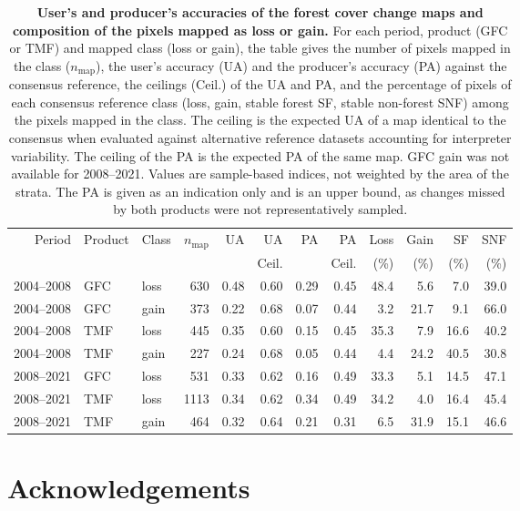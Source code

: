 \documentclass[paper=a4, fontsize=12pt, DIV=13, english, dvipsnames]{scrartcl}
\begin{document}
\begin{table}[htbp]
\caption{\label{tab:orge0d9ad2}\textbf{User's and producer's accuracies of the forest cover change maps and composition of the pixels mapped as loss or gain.} For each period, product (GFC or TMF) and mapped class (loss or gain), the table gives the number of pixels mapped in the class (\(n_{\text{map}}\)), the user's accuracy (UA) and the producer's accuracy (PA) against the consensus reference, the ceilings (Ceil.) of the UA and PA, and the percentage of pixels of each consensus reference class (loss, gain, stable forest SF, stable non-forest SNF) among the pixels mapped in the class. The ceiling is the expected UA of a map identical to the consensus when evaluated against alternative reference datasets accounting for interpreter variability. The ceiling of the PA is the expected PA of the same map. GFC gain was not available for 2008--2021. Values are sample-based indices, not weighted by the area of the strata. The PA is given as an indication only and is an upper bound, as changes missed by both products were not representatively sampled.\label{tab:change-ua}\\
}
\centering
\small
\begin{tabular}{rllrrrrrrrrr}
\toprule
Period & Product & Class & \(n_{\text{map}}\) & UA & UA & PA & PA & Loss & Gain & SF & SNF\\
 &  &  &  &  & Ceil. &  & Ceil. & (\%) & (\%) & (\%) & (\%)\\
\midrule
2004--2008 & GFC & loss & 630 & 0.48 & 0.60 & 0.29 & 0.45 & 48.4 & 5.6 & 7.0 & 39.0\\
2004--2008 & GFC & gain & 373 & 0.22 & 0.68 & 0.07 & 0.44 & 3.2 & 21.7 & 9.1 & 66.0\\
2004--2008 & TMF & loss & 445 & 0.35 & 0.60 & 0.15 & 0.45 & 35.3 & 7.9 & 16.6 & 40.2\\
2004--2008 & TMF & gain & 227 & 0.24 & 0.68 & 0.05 & 0.44 & 4.4 & 24.2 & 40.5 & 30.8\\
2008--2021 & GFC & loss & 531 & 0.33 & 0.62 & 0.16 & 0.49 & 33.3 & 5.1 & 14.5 & 47.1\\
2008--2021 & TMF & loss & 1113 & 0.34 & 0.62 & 0.34 & 0.49 & 34.2 & 4.0 & 16.4 & 45.4\\
2008--2021 & TMF & gain & 464 & 0.32 & 0.64 & 0.21 & 0.31 & 6.5 & 31.9 & 15.1 & 46.6\\
\bottomrule
\end{tabular}
\end{table}

\newpage
\section{Acknowledgements}
\label{sec:org7121ed2}
\end{document}
